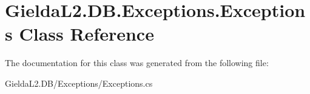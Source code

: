\hypertarget{class_gielda_l2_1_1_d_b_1_1_exceptions_1_1_exceptions}{}\section{Gielda\+L2.\+D\+B.\+Exceptions.\+Exceptions Class Reference}
\label{class_gielda_l2_1_1_d_b_1_1_exceptions_1_1_exceptions}


The documentation for this class was generated from the following file\+:\begin{DoxyCompactItemize}
\item 
Gielda\+L2.\+D\+B/\+Exceptions/Exceptions.\+cs\end{DoxyCompactItemize}
